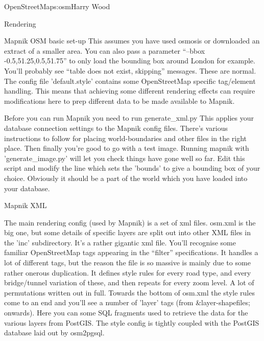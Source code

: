 \begin{aosachapter}{OpenStreetMap}{s:osm}{Harry Wood}
\begin{aosasect1}{Rendering}
\begin{aosasect2}{Mapnik OSM basic set-up}
This assumes you have used osmosis or downloaded an extract of a
smaller area. You can also pass a parameter ``--bbox
-0.5,51.25,0.5,51.75'' to only load the bounding box around London for
example. You'll probably see ``table does not exist, skipping''
messages. These are normal. The config file 'default.style' contains
some OpenStreetMap specific tag/element handling. This means that
achieving some different rendering effects can require modifications
here to prep different data to be made available to Mapnik.

Before you can run Mapnik you need to run generate\_xml.py This applies
your database connection settings to the Mapnik config files. There's
various instructions to follow for placing world-boundaries and other
files in the right place. Then finally you're good to go with a test
image. Running mapnik with 'generate\_image.py' will let you check
things have gone well so far. Edit this script and modify the line
which sets the 'bounds' to give a bounding box of your
choice. Obviously it should be a part of the world which you have
loaded into your database.

\end{aosasect2}

\begin{aosasect2}{Mapnik XML}

The main rendering config (used by Mapnik) is a set of xml
files. osm.xml is the big one, but some details of specific layers are
split out into other XML files in the 'inc' subdirectory. It's a
rather gigantic xml file. You'll recognise some familiar OpenStreetMap
tags appearing in the ``filter'' specifications. It handles a lot of
different tags, but the reason the file is so massive is mainly due to
some rather onerous duplication. It defines style rules for every road
type, and every bridge/tunnel variation of these, and then repeats for
every zoom level. A lot of permutations written out in full. Towards
the bottom of osm.xml the style rules come to an end and you'll see a
number of 'layer' tags (from \&layer-shapefiles; onwards). Here you can
some SQL fragments used to retrieve the data for the various layers
from PostGIS. The style config is tightly coupled with the PostGIS
database laid out by osm2pgsql.


\end{aosasect2}
\end{aosasect1}
\end{aosachapter}
